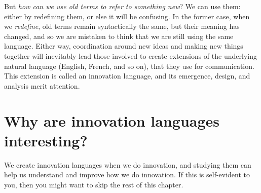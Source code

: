 But \textit{how can we use old terms to refer to something new}? We can use them: either by redefining them, or else it will be confusing. In the former case, when we \textit{redefine}, old terms remain syntactically the same, but their meaning has changed, and so we are mistaken to think that we are still using the same language. Either way, coordination around new ideas and making new things together will inevitably lead those involved to create extensions of the underlying natural language (English, French, and so on), that they use for communication. This extension is called an innovation language, and its emergence, design, and analysis merit attention.

\section{Why are innovation languages interesting?}
\label{c1-s5}
We create innovation languages when we do innovation, and studying them can help us understand and improve how we do innovation. If this is self-evident to you, then you might want to skip the rest of this chapter.

